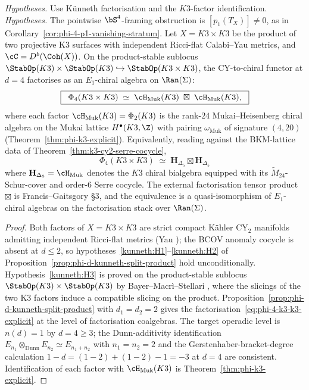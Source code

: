 \begin{theorem}
\label{thm:phi-4-k3-k3-kunneth-explicit}
\noindent\emph{Hypotheses.} Use K\"unneth factorisation and the $K3$-factor identification.
\noindent\emph{Hypotheses.} The pointwise $\bS^4$-framing obstruction is $[p_1(T_X)] \neq 0$, as in Corollary~\ref{cor:phi-4-p1-vanishing-stratum}.
%
%
Let $X = K3 \times K3$ be the product of two projective K$3$ surfaces with independent Ricci-flat Calabi--Yau metrics, and $\cC = D^b(\Coh(X))$. On the product-stable sublocus $\StabOp(K3) \times \StabOp(K3) \hookrightarrow \StabOp(K3 \times K3)$, the CY-to-chiral functor at $d = 4$ factorises as an $E_1$-chiral algebra on $\Ran(\Sigma)$:
\begin{equation}
\label{eq:phi-4-k3-k3-explicit}
 \boxed{\;\;
 \Phi_4(K3 \times K3) \;\simeq\; \cH_{\mathrm{Muk}}(K3) \;\boxtimes\; \cH_{\mathrm{Muk}}(K3),
 \;\;}
\end{equation}
where each factor $\cH_{\mathrm{Muk}}(K3) = \Phi_2(K3)$ is the rank-$24$ Mukai--Heisenberg chiral algebra on the Mukai lattice $H^\bullet(K3, \Z)$ with pairing $\omega_{\mathrm{Muk}}$ of signature $(4, 20)$ \textup{(}Theorem~\textup{\ref{thm:phi-k3-explicit}}\textup{).} Equivalently, reading against the BKM-lattice data of Theorem~\textup{\ref{thm:k3-cy2-serre-cocycle}},
\[
 \Phi_4(K3 \times K3) \;\simeq\; \mathbf{H}_{\Delta_5} \boxtimes \mathbf{H}_{\Delta_5}
\]
where $\mathbf{H}_{\Delta_5} = \cH_{\mathrm{Muk}}$ denotes the $K3$ chiral bialgebra equipped with its $\widetilde{M}_{24}$-Schur-cover and order-$6$ Serre cocycle. The external factorisation tensor product $\boxtimes$ is Francis--Gaitsgory \cite{FrancisGaitsgory2012} \S$3$, and the equivalence is a quasi-isomorphism of $E_1$-chiral algebras on the factorisation stack over $\Ran(\Sigma)$.
\end{theorem}

\begin{proof}
Both factors of $X = K3 \times K3$ are strict compact K\"ahler CY$_2$ manifolds admitting independent Ricci-flat metrics (Yau \cite{Yau1978}); the BCOV anomaly cocycle is absent at $d \le 2$, so hypotheses~\ref{kunneth:H1}--\ref{kunneth:H2} of Proposition~\textup{\ref{prop:phi-d-kunneth-split-product}} hold unconditionally. Hypothesis~\ref{kunneth:H3} is proved on the product-stable sublocus $\StabOp(K3) \times \StabOp(K3)$ by Bayer--Macr\`i--Stellari \cite{BayerMacriStellari2016}, where the slicings of the two K$3$ factors induce a compatible slicing on the product. Proposition~\textup{\ref{prop:phi-d-kunneth-split-product}} with $d_1 = d_2 = 2$ gives the factorisation~\eqref{eq:phi-4-k3-k3-explicit} at the level of factorisation coalgebras. The target operadic level is $n(d) = 1$ by $d = 4 \ge 3$; the Dunn-additivity identification $E_{n_1} \otimes_{\mathrm{Dunn}} E_{n_2} \simeq E_{n_1 + n_2}$ with $n_1 = n_2 = 2$ and the Gerstenhaber-bracket-degree calculation $1 - d = (1 - 2) + (1 - 2) - 1 = -3$ at $d = 4$ are consistent. Identification of each factor with $\cH_{\mathrm{Muk}}(K3)$ is Theorem~\textup{\ref{thm:phi-k3-explicit}}.
\end{proof}

